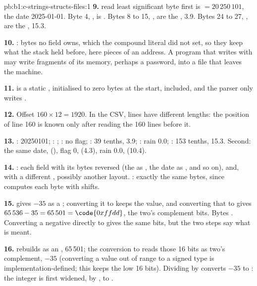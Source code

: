 \begin{solution}{pb:b1:c-strings-structs-files:1}
\textbf{9.}  read least significant byte first is  $= 20\,250\,101$, the date
2025-01-01. Byte 4, , is . Bytes 8 to 15, , are the 
, 3.9. Bytes 24 to 27, , are the  , 15.3.

\textbf{10.} : bytes no field owns, which the compound literal did not set, so they keep what the stack held
before, here pieces of an address. A program that writes  with  may write fragments of its
memory, perhaps a password, into a file that leaves the machine.

\textbf{11.}  is a static , initialised to zero bytes at the start,  included, and the parser
only writes .

\textbf{12.} Offset $160 \times 12 = 1920$. In the CSV, lines have different lengths: the position of line 160 is
known only after reading the 160 lines before it.

\textbf{13.} : 20250101; : ; : no flag; : 39 tenths, 3.9;
: rain 0.0; : 153 tenths, 15.3. Second: the same date,  (), flag 0,
 (4.3), rain 0.0,  (10.4).

\textbf{14.} : each field with its bytes reversed (the  as ,
the date as , and so on), and, with a different , possibly another layout. :
exactly the same bytes, since  computes each byte with shifts.

\textbf{15.}  gives $-35$ as a ; converting it to  keeps the value, and converting
that to  gives $65\,536 - 35 = 65\,501 = \code{0xffdd}$, the two's complement bits. Bytes .
Converting a negative  directly to  gives the same bits, but the two steps say what is meant.

\textbf{16.}  rebuilds  as an , 65\,501; the conversion to  reads
those 16 bits as two's complement, $-35$ (converting a value out of range to a signed type is
implementation-defined; this  keeps the low 16 bits). Dividing by  converts $-35$ to : the integer is first widened, by , to
.


\end{solution}
